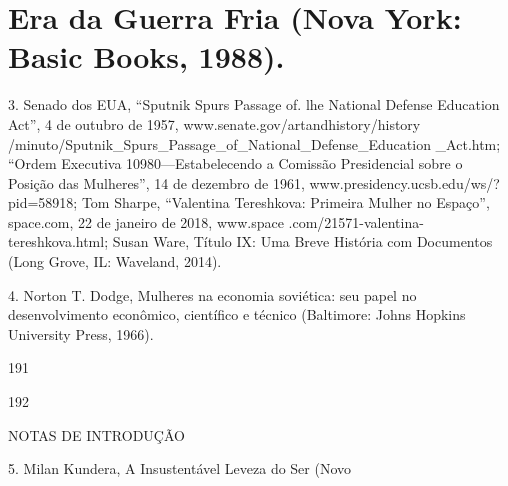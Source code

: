\section{Era da Guerra Fria (Nova York: Basic Books, 1988).}
 \par 
3. Senado dos EUA, “Sputnik Spurs Passage of. lhe National Defense Education Act”, {\color{blue}4} de outubro de 1957, www.senate.gov/artandhistory/history /minuto/Sputnik_Spurs_Passage_of_National_Defense_Education _Act.htm; “Ordem Executiva 10980—Estabelecendo a Comissão Presidencial sobre o Posição das Mulheres”, {\color{blue}14} de dezembro de 1961, www.presidency.ucsb.edu/ws/?pid=58918; Tom Sharpe, “Valentina Tereshkova: Primeira Mulher no Espaço”, space.com, {\color{blue}22} de janeiro de 2018, www.space .com/21571-valentina-tereshkova.html; Susan Ware, Título IX: Uma Breve História com Documentos (Long Grove, IL: Waveland, 2014).
 \par 
4. Norton T. Dodge, Mulheres na economia soviética: seu papel no desenvolvimento econômico, científico e técnico (Baltimore: Johns Hopkins University Press, 1966).
 \par 
191
 \par 
192
 \par 
NOTAS DE INTRODUÇÃO
 \par 
5. Milan Kundera, A Insustentável Leveza do Ser (Novo
 \par 
